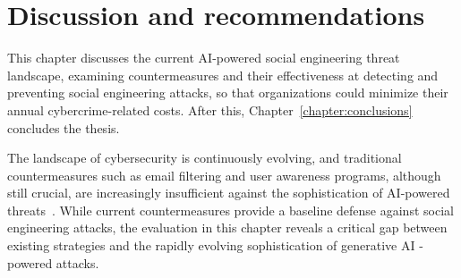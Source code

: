 
\chapter{Discussion and recommendations\label{chapter:discussion}}
\begin{comment}
- viimeisteltyä kirjakieltä, ei alan slangia. "does not", ei "doesn't"
- tietoturvakoulutus työajalla, EI omalla ajalla
- armeijassa saa vapaata hyvästä suorituksesta ammunnoissa. joku bonus gamifikaation kautta?
- employees can work from home, mention this? extra challenges for cybersecurity
- oman tietoturvatiimin tekemänä tai kolmannen osapuolen palveluna
- post-its and posters will likely be tuned out by the brain eventually. thus they must be kept fresh. luckily DALL-E can easily create such content, as often as needed
- orvot aliluvut merkki jäsentelyongelmasta, orvot luvunalotusrivit pakotetaan muun tekstin kanssa samalle sivulle
- muistuttamalla tärkeimmistä havainnoista luvun lopussa tavoitteeseen suhteutettuna
- Teknisten johtopäätösten tuoma impakti
- muistuttaa mieleen tutkimuskysymyksen, mainitsee tärkeimmät tulokset ja niiden perusteet
- keskittyy impaktiin ja esimerkiksi suosituksiin.
- ei pelkästään summeeraa luku kerrallaan aiempaa tekstiä
\end{comment}

This chapter discusses the current AI-powered social engineering threat landscape, examining countermeasures and their effectiveness at detecting and preventing social engineering attacks, so that organizations could minimize their annual cybercrime-related costs. After this, Chapter~\ref{chapter:conclusions} concludes the thesis.


The landscape of cybersecurity is continuously evolving, and traditional countermeasures such as email filtering and user awareness programs, although still crucial, are increasingly insufficient against the sophistication of AI-powered threats~\citep{fakhouri_AI_Driven_Solutions_SE_Attacks_2024}. While current countermeasures provide a baseline defense against social engineering attacks, the evaluation in this chapter reveals a critical gap between existing strategies and the rapidly evolving sophistication of generative AI -powered attacks. 


